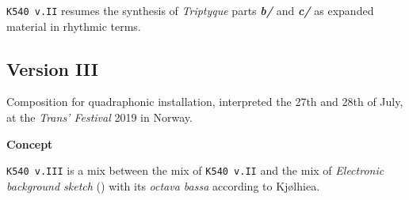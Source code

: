 \smallskip

\texttt{K540 v.II} resumes the synthesis of \textit{Triptyque} parts \textbf{\textit{b/}} and  \textbf{\textit{c/}} as expanded material in rhythmic terms.%

\subsection[\texttt{v.III}]{Version III}
\label{k540v3}

\smallskip

Composition for quadraphonic installation, interpreted the 27th and 28th of July, at the \textit{Trans' Festival }2019 in Norway. %

\bigskip

\noindent \textbf{{\large Concept}}
\hrulefill

\bigskip

\texttt{K540 v.III} is a mix between the mix of \texttt{K540 v.II} and the mix of \textsl{Electronic background sketch} () with its \textit{octava bassa} according to Kj{\o}lhiea. 